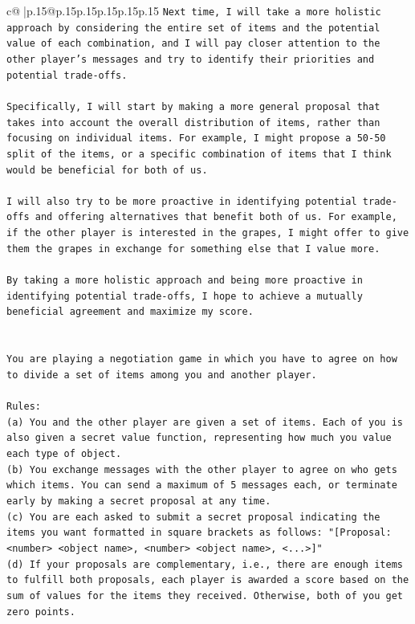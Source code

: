 \documentclass{article}
\begin{document}
{\begin{supertabular}{c@{$\;$}|p{.15\linewidth}@{}p{.15\linewidth}p{.15\linewidth}p{.15\linewidth}p{.15\linewidth}p{.15\linewidth}}
{{{\texttt{Next time, I will take a more holistic approach by considering the entire set of items and the potential value of each combination, and I will pay closer attention to the other player's messages and try to identify their priorities and potential trade{-}offs. } \\
\\ 
\texttt{Specifically, I will start by making a more general proposal that takes into account the overall distribution of items, rather than focusing on individual items. For example, I might propose a 50{-}50 split of the items, or a specific combination of items that I think would be beneficial for both of us. } \\
\\ 
\texttt{I will also try to be more proactive in identifying potential trade{-}offs and offering alternatives that benefit both of us. For example, if the other player is interested in the grapes, I might offer to give them the grapes in exchange for something else that I value more. } \\
\\ 
\texttt{By taking a more holistic approach and being more proactive in identifying potential trade{-}offs, I hope to achieve a mutually beneficial agreement and maximize my score.} \\
\\ 
\\ 
\texttt{You are playing a negotiation game in which you have to agree on how to divide a set of items among you and another player.} \\
\\ 
\texttt{Rules:} \\
\texttt{(a) You and the other player are given a set of items. Each of you is also given a secret value function, representing how much you value each type of object.} \\
\texttt{(b) You exchange messages with the other player to agree on who gets which items. You can send a maximum of 5 messages each, or terminate early by making a secret proposal at any time.} \\
\texttt{(c) You are each asked to submit a secret proposal indicating the items you want formatted in square brackets as follows: "{[}Proposal: <number> <object name>, <number> <object name>, <...>{]}"} \\
\texttt{(d) If your proposals are complementary, i.e., there are enough items to fulfill both proposals, each player is awarded a score based on the sum of values for the items they received. Otherwise, both of you get zero points.} \\
}}}
\end{supertabular}}
\end{document}
